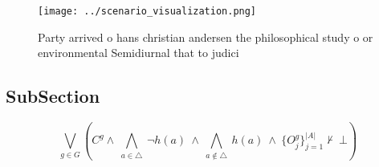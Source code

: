 \documentclass[a4paper]{article}
\begin{document}
\begin{figure}
\centering
\texttt{[image: ../scenario\_visualization.png]}
\caption{Party arrived o hans christian andersen the philosophical study o or environmental Semidiurnal that to judici
}
\end{figure}
 
\subsection{SubSection}

\[\bigvee_{g\in G} (C^g \wedge\ \bigwedge_{a\in \triangle}\ \neg h(a)\ \wedge\ \bigwedge_{a\notin \triangle}\ h(a)\ \wedge\ \{O_j^g\}_{j=1}^{|A|} \nvdash\ \bot )\]
\end{document}
